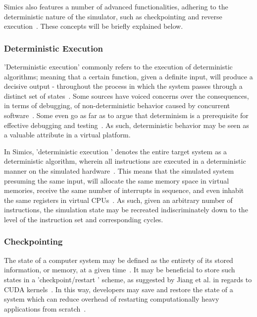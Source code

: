 Simics also features a number of advanced functionalities, adhering to the deterministic nature of the simulator, such as checkpointing and reverse execution~.
These concepts will be briefly explained below.

\subsubsection{Deterministic Execution}
\label{sec:simics_deterministicexecution}
'Deterministic execution' commonly refers to the execution of deterministic algorithms; meaning that a certain function, given a definite input, will produce a decisive output - throughout the process in which the system passes through a distinct set of states~.
Some sources have voiced concerns over the consequences, in terms of debugging, of non-deterministic behavior caused by concurrent software~.
Some even go as far as to argue that determinism is a prerequisite for effective debugging and testing~.
As such, deterministic behavior may be seen as a valuable attribute in a virtual platform.

In Simics, 'deterministic execution ' denotes the entire target system as a deterministic algorithm, wherein all instructions are executed in a deterministic manner on the simulated hardware~.
This means that the simulated system presuming the same input, will allocate the same memory space in virtual memories, receive the same number of interrupts in sequence, and even inhabit the same registers in virtual CPUs~.
As such, given an arbitrary number of instructions, the simulation state may be recreated indiscriminately down to the level of the instruction set and corresponding cycles.

\subsubsection{Checkpointing}
\label{sec:simics_checkpointing}
The state of a computer system may be defined as the entirety of its stored information, or memory, at a given time~.
It may be beneficial to store such states in a 'checkpoint/restart ' scheme, as suggested by Jiang et al. in regards to CUDA kernels~.
In this way, developers may save and restore the state of a system which can reduce overhead of restarting computationally heavy applications from scratch~.

